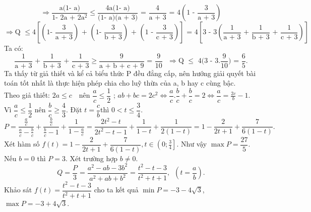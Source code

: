 \[\Rightarrow \frac{\text{a(1- a)}}{\text{1- 2a + 2}{{\text{a}}^{\text{2}}}}\le \frac{\text{4a(1- a)}}{\text{(1- a)(a + 3)}}\text{ = }\frac{\text{4}}{\text{a + 3}}\text{ = 4}\left( \text{1 - }\frac{\text{3}}{\text{a + 3}} \right)\]
 \[\Rightarrow \text{Q }\le \text{4}\left[ \left( \text{1- }\frac{\text{3}}{\text{a + 3}} \right)\text{ + }\left( \text{1- }\frac{\text{3}}{\text{b + 3}} \right)\text{ + }\left( \text{1 - }\frac{\text{3}}{\text{c + 3}} \right) \right]\text{ = 4}\left[ \text{3 - 3}\left( \frac{\text{1}}{\text{a + 3}}\text{ + }\frac{\text{1}}{\text{b + 3}}\text{ + }\frac{\text{1}}{\text{c + 3}} \right) \right]\]
Ta có:                  
\[\frac{\text{1}}{\text{a + 3}}\text{ + }\frac{\text{1}}{\text{b + 3}}\text{ + }\frac{\text{1}}{\text{c + 3}}\ge \frac{\text{9}}{\text{a + b + c + 9}}\text{ = }\frac{\text{9}}{\text{10}}\text{ }\Rightarrow \text{Q }\le \text{ 4(3 - 3}\text{.}\frac{\text{9}}{\text{10}}\text{) = }\frac{\text{6}}{\text{5}}.\]
\hda  Ta thấy từ giả thiết và kể cả biểu thức P đều đẳng cấp, nên hướng giải quyết bài toán tốt nhất là thực hiện phép chia cho luỹ thừa của a, b hay c cùng bậc.\\
Theo giả thiết: $2a\le c\text{ }$ nên $\dfrac{a}{c}\le \dfrac{1}{2}$ ; $ab+bc=2{{c}^{2}}\Leftrightarrow \dfrac{a}{c}.\dfrac{b}{c}+\dfrac{b}{c}=2\Leftrightarrow \dfrac{a}{c}=\frac{2c}{b}-1$.\\
Vì $\dfrac{a}{c}\le \dfrac{1}{2}$ nên $\dfrac{b}{c}\ge \dfrac{4}{3}$. Đặt $t=\dfrac{c}{b}$thì $0<t\le \dfrac{3}{4}$.
$$P=\frac{\frac{a}{c}}{\frac{a}{c}-\frac{b}{c}}+\frac{\frac{b}{c}}{\frac{b}{c}-1}+\frac{1}{1-\frac{a}{c}}=\frac{2{{t}^{2}}-t}{2{{t}^{2}}-t-1}+\frac{1}{1-t}+\frac{1}{2(1-t)}=1-\frac{2}{2t+1}+\frac{7}{6(1-t)}.$$
Xét hàm số $f(t)=1-\dfrac{2}{2t+1}+\dfrac{7}{6(1-t)},t\in \left( 0;\frac{3}{4} \right]$. Như vậy $\max P=\dfrac{27}{5}$.
\hda  Nếu $b = 0$ thì $P = 3$. Xét trường hợp $b\ne 0$.
\[Q=\frac{P}{3}=\frac{{{a}^{2}}-ab-3{{b}^{2}}}{{{a}^{2}}+ab+{{b}^{2}}}=\frac{{{t}^{2}}-t-3}{{{t}^{2}}+t+1},\,\,\,\left( t=\frac{a}{b} \right).\] Khảo sát $f\left( t \right)=\dfrac{{{t}^{2}}-t-3}{{{t}^{2}}+t+1}$ cho ta kết quả $\min P=-3-4\sqrt{3}$, $\max P=-3+4\sqrt{3}$.
